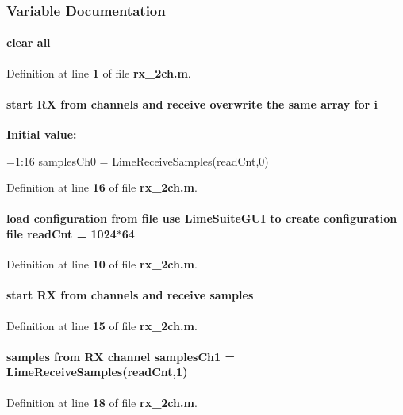 \subsubsection{Variable Documentation}
\paragraph[{all}]{\setlength{\rightskip}{0pt plus 5cm}clear all}\label{rx__2ch_8m_a4603254d9990f7140c024d51302d1a8f}


Definition at line {\bf 1} of file {\bf rx\+\_\+2ch.\+m}.

\paragraph[{i}]{\setlength{\rightskip}{0pt plus 5cm}start RX from channels and receive overwrite the same array for i}\label{rx__2ch_8m_a8e676834fe962ba0f9e1149e7978a27d}
{\bfseries Initial value\+:}
\begin{DoxyCode}
=1:16
    samplesCh0 = LimeReceiveSamples(readCnt,0)
\end{DoxyCode}


Definition at line {\bf 16} of file {\bf rx\+\_\+2ch.\+m}.

\paragraph[{read\+Cnt}]{\setlength{\rightskip}{0pt plus 5cm}load configuration from file use Lime\+Suite\+G\+UI to create configuration file read\+Cnt = 1024$\ast$64}\label{rx__2ch_8m_a3a328aa3127ae72c8296ed0ea4897f99}


Definition at line {\bf 10} of file {\bf rx\+\_\+2ch.\+m}.

\paragraph[{samples}]{\setlength{\rightskip}{0pt plus 5cm}start RX from channels and receive samples}\label{rx__2ch_8m_a2fb40cd30885c423c71ec49523b86546}


Definition at line {\bf 15} of file {\bf rx\+\_\+2ch.\+m}.

\paragraph[{samples\+Ch1}]{ {\bf samples} from RX channel samples\+Ch1 = Lime\+Receive\+Samples({\bf read\+Cnt},1)}\label{rx__2ch_8m_ada04640f01123a1e8896c7a72f099e6c}


Definition at line {\bf 18} of file {\bf rx\+\_\+2ch.\+m}.

